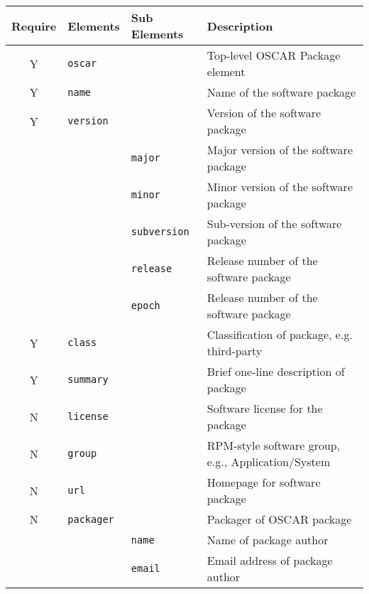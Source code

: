 \begin{table}[htbp]
  \begin{center}
  \begin{tabular}{|c|l|l|l|} \hline
  {\bfseries Require} & {\bfseries Elements} & {\bfseries Sub Elements} & {\bfseries Description}\\\hline
  \hline



  Y & \verb(oscar(   &   & Top-level OSCAR Package element               \\ \hline
  Y & \verb(name(    &   & Name of the software package                  \\ \hline


  Y & \verb(version(& & Version of the software package           \\\cline{3-4}
    & & \verb(major(  & Major version of the software package     \\\cline{3-4}
    & & \verb(minor(  & Minor version of the software package     \\\cline{3-4}
    & & \verb(subversion( & Sub-version of the software package   \\\cline{3-4}
    & & \verb(release(    & Release number of the software package\\\cline{3-4}
    & & \verb(epoch(      & Release number of the software package\\\hline


  Y & \verb(class(   &   & Classification of package, e.g. third-party   \\ \hline
  Y & \verb(summary( &   & Brief one-line description of package         \\ \hline
  N & \verb(license( &   & Software license for the package              \\ \hline
  N & \verb(group(   &   & RPM-style software group, e.g., Application/System\\\hline
  N & \verb(url(     &   & Homepage for software package                 \\ \hline


  N & \verb(packager(&   & Packager of OSCAR package              \\\cline{3-4}
    & & \verb(name(   & Name of package author                    \\\cline{3-4}
    & & \verb(email(  & Email address of package author           \\\hline



\end{tabular}
\end{center}
\end{table}

